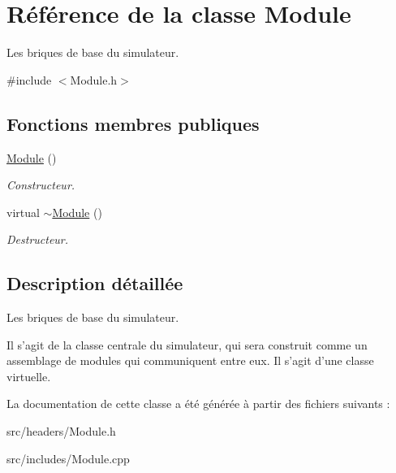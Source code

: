 \hypertarget{classModule}{\section{Référence de la classe Module}
\label{classModule}
}


Les briques de base du simulateur.  




{\ttfamily \#include $<$Module.\-h$>$}

\subsection*{Fonctions membres publiques}
\begin{DoxyCompactItemize}
\item 
\hypertarget{classModule_a5a240a8a9ab1813b17bcb810b24ceaea}{\hyperlink{classModule_a5a240a8a9ab1813b17bcb810b24ceaea}{Module} ()}\label{classModule_a5a240a8a9ab1813b17bcb810b24ceaea}

\begin{DoxyCompactList}\small\item\em Constructeur. \end{DoxyCompactList}\item 
\hypertarget{classModule_a7c9d9c096786d127590fdd8aa2b7d681}{virtual \hyperlink{classModule_a7c9d9c096786d127590fdd8aa2b7d681}{$\sim$\-Module} ()}\label{classModule_a7c9d9c096786d127590fdd8aa2b7d681}

\begin{DoxyCompactList}\small\item\em Destructeur. \end{DoxyCompactList}\end{DoxyCompactItemize}


\subsection{Description détaillée}
Les briques de base du simulateur. 

Il s'agit de la classe centrale du simulateur, qui sera construit comme un assemblage de modules qui communiquent entre eux. Il s'agit d'une classe virtuelle. 

La documentation de cette classe a été générée à partir des fichiers suivants \-:\begin{DoxyCompactItemize}
\item 
src/headers/Module.\-h\item 
src/includes/Module.\-cpp\end{DoxyCompactItemize}
